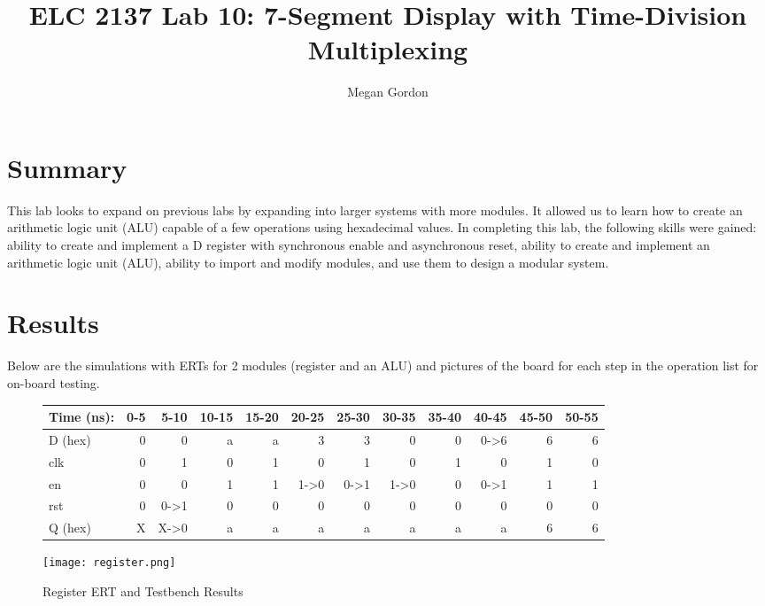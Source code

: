 \documentclass[11pt]{article}
\begin{document}
\title{ELC 2137 Lab 10: 7-Segment Display with Time-Division Multiplexing}
\author{Megan Gordon}

\maketitle


\section*{Summary}

This lab looks to expand on previous labs by expanding into larger systems with more modules. It allowed us to learn how to create an arithmetic logic unit (ALU) capable of a few operations using hexadecimal values. In completing this lab, the following skills were gained: ability to create and implement a D register with synchronous enable and asynchronous reset, ability to create and implement an arithmetic logic unit (ALU), ability to import and modify modules, and use them to design a modular system. 



\section*{Results}

Below are the simulations with ERTs for 2 modules (register and an ALU) and pictures of the board for each step in the operation list for on-board testing. 
\medskip

\begin{figure}[ht]\centering
	\begin{tabular}{l|rrrrrrrrrrr}
		Time (ns): & 0-5 & 5-10 & 10-15 & 15-20 & 20-25 & 25-30 & 30-35 & 35-40 & 40-45 & 45-50 & 50-55 \\
		\midrule 
		D (hex) & 0 & 0 & a & a & 3 & 3 & 0 & 0 & 0->6 & 6 & 6  \\
		clk & 0 & 1 & 0 & 1 & 0 & 1 & 0 & 1 & 0 & 1 & 0 \\
		en & 0 & 0 & 1 & 1 & 1->0 & 0->1 & 1->0 & 0 & 0->1 & 1 & 1 \\
		rst & 0 & 0->1 & 0 & 0 & 0 & 0 & 0 & 0 & 0 & 0 & 0 \\
		\midrule
		Q (hex) & X & X->0 & a & a & a & a & a & a & a & 6 & 6  \\
		\bottomrule
	\end{tabular}\medskip

	\texttt{[image: register.png]}
	\caption{Register ERT and Testbench Results}
	\label{fig:sim_with_table}
\end{figure}
\end{document}

